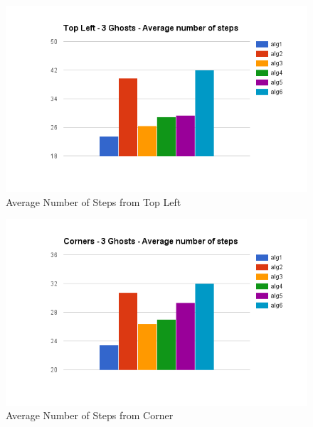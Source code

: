\documentclass[11pt]{article}
\begin{document}
\begin{multicols}{2}
\begin{figure}[H]
	\includegraphics[scale=0.45]{leftsteps.png}
	\caption{Average Number of Steps from Top Left}
	\label{fig:averagenumstepsleft}
\end{figure}

\begin{figure}[H]
	\includegraphics[scale=0.45]{cornersteps.png}
	\caption{Average Number of Steps from Corner}
	\label{fig:averagenumstepscorner}
\end{figure}




\end{multicols}
\end{document}
